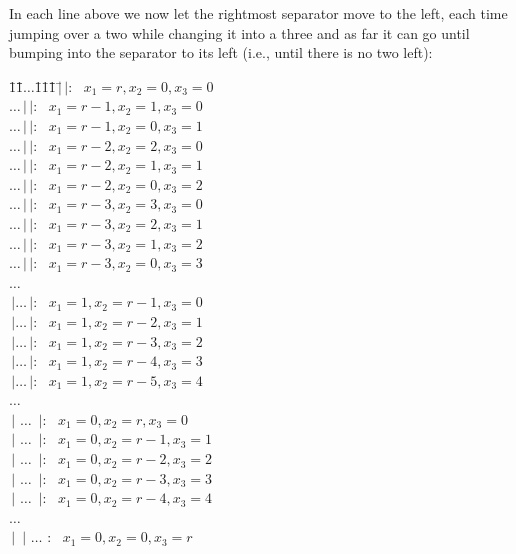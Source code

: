\documentclass[titlepage]{article}
\theoremstyle{definition}
\numberwithin{equation}{subsection}
\numberwithin{remark}{subsection}
\begin{document}
\par\noindent
In each line above we now let the rightmost separator move to the left, each time jumping over a two while changing it into a three and as far it can go until bumping into the separator to its left (i.e., until there is no two left):
{\small{
\begin{tabbing}
\hspace*{50pt}\=1\=1\=$\ldots$\=1\=1\=1\=$\,|$\=$\,|$: $\,\,\,x_1=r, x_2=0, x_3=0$\\
\>$\ldots$\>$\,|$\>$\,|$: $\,\,\,x_1=r-1, x_2=1, x_3=0$\\
\>$\ldots$\>$\,|$\>$\,|$: $\,\,\,x_1=r-1, x_2=0, x_3=1$\\
\>$\ldots$\>$\,|$\>$\,|$: $\,\,\,x_1=r-2, x_2=2, x_3=0$\\
\>$\ldots$\>$\,|$\>$\,|$: $\,\,\,x_1=r-2, x_2=1, x_3=1$\\
\>$\ldots$\>$\,|$\>$\,|$: $\,\,\,x_1=r-2, x_2=0, x_3=2$\\
\>$\ldots$\>$\,|$\>$\,|$: $\,\,\,x_1=r-3, x_2=3, x_3=0$\\
\>$\ldots$\>$\,|$\>$\,|$: $\,\,\,x_1=r-3, x_2=2, x_3=1$\\
\>$\ldots$\>$\,|$\>$\,|$: $\,\,\,x_1=r-3, x_2=1, x_3=2$\\
\>$\ldots$\>$\,|$\>$\,|$: $\,\,\,x_1=r-3, x_2=0, x_3=3$\\
\>\>\>$\ldots$\\
\>$\,|$\>$\ldots$\>$\,|$: $\,\,\,x_1=1, x_2=r-1, x_3=0$\\
\>$\,|$\>$\ldots$\>$\,|$: $\,\,\,x_1=1, x_2=r-2, x_3=1$\\
\>$\,|$\>$\ldots$\>$\,|$: $\,\,\,x_1=1, x_2=r-3, x_3=2$\\
\>$\,|$\>$\ldots$\>$\,|$: $\,\,\,x_1=1, x_2=r-4, x_3=3$\\
\>$\,|$\>$\ldots$\>$\,|$: $\,\,\,x_1=1, x_2=r-5, x_3=4$\\
\>\>\>$\ldots$\\
\>$\,|$    \>$\ldots$        \>$\,|$: $\,\,\,x_1=0, x_2=r, x_3=0$\\
\>$\,|$    \>$\ldots$        \>$\,|$: $\,\,\,x_1=0, x_2=r-1, x_3=1$\\
\>$\,|$    \>$\ldots$     \>$\,|$: $\,\,\,x_1=0, x_2=r-2, x_3=2$\\
\>$\,|$    \>$\ldots$    \>$\,|$: $\,\,\,x_1=0, x_2=r-3, x_3=3$\\
\>$\,|$    \>$\ldots$ \>$\,|$: $\,\,\,x_1=0, x_2=r-4, x_3=4$\\
\>\>\>$\ldots$\\
\>$\,|$  \>$\,|$  \>$\ldots$ : $\,\,\,x_1=0, x_2=0, x_3=r$
\end{tabbing}}}
\end{document}
